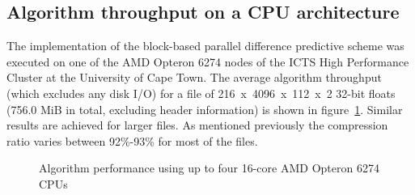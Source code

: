 \subsection{Algorithm throughput on a CPU architecture}
The implementation of the block-based parallel difference predictive scheme was executed on one of the AMD Opteron 6274 nodes of the ICTS High 
Performance Cluster at the University of Cape Town. The average algorithm throughput (which excludes any disk I/O) for a file of 
216~x~4096~x~112~x~2 32-bit floats (756.0 MiB in total, excluding header information) is shown in figure~\ref{ALG_THROUGPUT}. Similar results are 
achieved for larger files. As mentioned previously the compression ratio varies between 92\%-93\% for most of the files.
\begin{figure}[ht!]
 \begin{mdframed}
 \centering
  \caption{Algorithm performance using up to four 16-core AMD Opteron 6274 CPUs}
  \label{ALG_THROUGPUT}
  \end{mdframed}
\end{figure}
